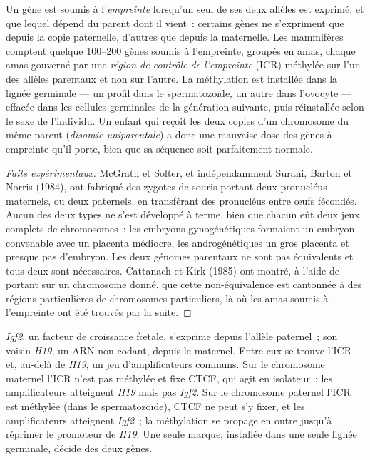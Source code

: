 \begin{definition}\label{def:b3:chromatin-epigenetics:imprinting}
Un gène est soumis à l'\emph{empreinte} lorsqu'un seul de ses deux
allèles est exprimé, et que lequel dépend du parent dont il vient~:
certains gènes ne s'expriment que depuis la copie paternelle, d'autres
que depuis la maternelle. Les mammifères comptent quelque
\numrange{100}{200} gènes soumis à l'empreinte, groupés en amas, chaque
amas gouverné par une \emph{région de contrôle de l'empreinte} (ICR)
méthylée sur l'un des allèles parentaux et non sur l'autre. La
méthylation est installée dans la lignée germinale --- un profil dans
le spermatozoïde, un autre dans l'ovocyte --- effacée dans les cellules
germinales de la génération suivante, puis réinstallée selon le sexe de
l'individu. Un enfant qui reçoit les deux copies d'un chromosome du
même parent (\emph{disomie uniparentale}) a donc une mauvaise dose des
gènes à empreinte qu'il porte, bien que sa séquence soit parfaitement
normale.
\end{definition}

\begin{proof}[Faits expérimentaux]
McGrath et Solter, et indépendamment Surani, Barton et Norris (1984),
ont fabriqué des zygotes de souris portant deux pronucléus maternels,
ou deux paternels, en transférant des pronucléus entre œufs fécondés.
Aucun des deux types ne s'est développé à terme, bien que chacun eût
deux jeux complets de chromosomes~: les embryons gynogénétiques
formaient un embryon convenable avec un placenta médiocre, les
androgénétiques un gros placenta et presque pas d'embryon. Les deux
génomes parentaux ne sont pas équivalents et tous deux sont
nécessaires. Cattanach et Kirk (1985) ont montré, à l'aide de  portant sur un chromosome donné, que cette
non-équivalence est cantonnée à des régions particulières de
chromosomes particuliers, là où les amas soumis à l'empreinte ont été
trouvés par la suite.
\end{proof}

\begin{example}\label{ex:b3:chromatin-epigenetics:igf2}
\emph{Igf2}, un facteur de croissance fœtale, s'exprime depuis l'allèle
paternel~; son voisin \emph{H19}, un ARN non codant, depuis le
maternel. Entre eux se trouve l'ICR et, au-delà de \emph{H19}, un jeu
d'amplificateurs communs. Sur le chromosome maternel l'ICR n'est pas
méthylée et fixe CTCF, qui agit en isolateur~: les amplificateurs
atteignent \emph{H19} mais pas \emph{Igf2}. Sur le chromosome paternel
l'ICR est méthylée (dans le spermatozoïde), CTCF ne peut s'y fixer, et
les amplificateurs atteignent \emph{Igf2}~; la méthylation se propage
en outre jusqu'à réprimer le promoteur de \emph{H19}. Une seule marque,
installée dans une seule lignée germinale, décide des deux gènes.
\end{example}

